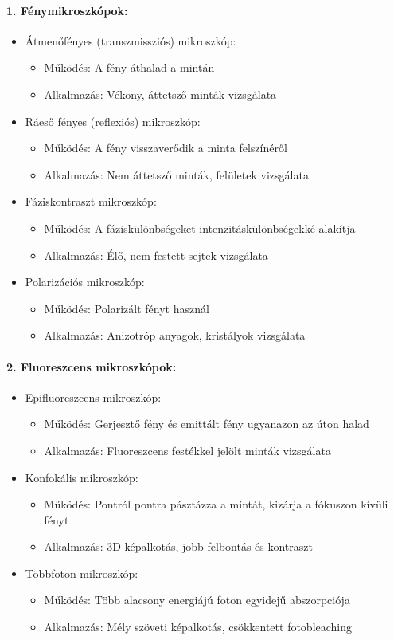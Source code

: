\documentclass[a4paper,12pt]{article}
\begin{document}
\paragraph{1. Fénymikroszkópok:} \begin{itemize} \item Átmenőfényes (transzmissziós) mikroszkóp: \begin{itemize} \item Működés: A fény áthalad a mintán \item Alkalmazás: Vékony, áttetsző minták vizsgálata \end{itemize} \item Ráeső fényes (reflexiós) mikroszkóp: \begin{itemize} \item Működés: A fény visszaverődik a minta felszínéről \item Alkalmazás: Nem áttetsző minták, felületek vizsgálata \end{itemize} \item Fáziskontraszt mikroszkóp: \begin{itemize} \item Működés: A fáziskülönbségeket intenzitáskülönbségekké alakítja \item Alkalmazás: Élő, nem festett sejtek vizsgálata \end{itemize} \item Polarizációs mikroszkóp: \begin{itemize} \item Működés: Polarizált fényt használ \item Alkalmazás: Anizotróp anyagok, kristályok vizsgálata \end{itemize} \end{itemize}

\paragraph{2. Fluoreszcens mikroszkópok:} \begin{itemize} \item Epifluoreszcens mikroszkóp: \begin{itemize} \item Működés: Gerjesztő fény és emittált fény ugyanazon az úton halad \item Alkalmazás: Fluoreszcens festékkel jelölt minták vizsgálata \end{itemize} \item Konfokális mikroszkóp: \begin{itemize} \item Működés: Pontról pontra pásztázza a mintát, kizárja a fókuszon kívüli fényt \item Alkalmazás: 3D képalkotás, jobb felbontás és kontraszt \end{itemize} \item Többfoton mikroszkóp: \begin{itemize} \item Működés: Több alacsony energiájú foton egyidejű abszorpciója \item Alkalmazás: Mély szöveti képalkotás, csökkentett fotobleaching \end{itemize} \end{itemize}
\end{document}
